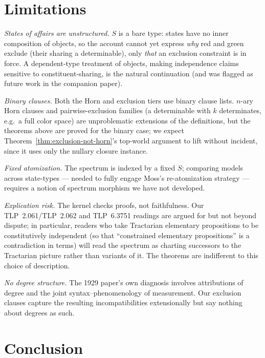\documentclass[10pt, letterpaper]{article}
\theoremstyle{remark}
\newcommand{\TLP}[1]{TLP~#1}
\begin{document}
\section{Limitations}\label{sec:limitations}

\emph{States of affairs are unstructured.} $S$ is a bare type: states have
no inner composition of objects, so the account cannot yet express
\emph{why} red and green exclude (their sharing a determinable), only
\emph{that} an exclusion constraint is in force. A dependent-type treatment
of objects, making independence claims sensitive to constituent-sharing, is
the natural continuation (and was flagged as future work in the companion
paper).

\emph{Binary clauses.} Both the Horn and exclusion tiers use binary clause
lists. $n$-ary Horn clauses and pairwise-exclusion families (a determinable
with $k$ determinates, e.g.\ a full color space) are unproblematic
extensions of the definitions, but the theorems above are proved for the
binary case; we expect Theorem~\ref{thm:exclusion-not-horn}'s top-world
argument to lift without incident, since it uses only the nullary closure
instance.

\emph{Fixed atomization.} The spectrum is indexed by a fixed $S$; comparing
models across state-types --- needed to fully engage Moss's re-atomization
strategy --- requires a notion of spectrum morphism we have not developed.

\emph{Explication risk.} The kernel checks proofs, not faithfulness. Our
\TLP{2.061}/\TLP{2.062} and \TLP{6.3751} readings are argued for but not
beyond dispute; in particular, readers who take Tractarian elementary
propositions to be constitutively independent (so that ``constrained
elementary propositions'' is a contradiction in terms) will read the spectrum
as charting successors to the Tractarian picture rather than variants of it.
The theorems are indifferent to this choice of description.

\emph{No degree structure.} The 1929 paper's own diagnosis involves
attributions of degree and the joint syntax--phenomenology of measurement.
Our exclusion clauses capture the resulting incompatibilities extensionally
but say nothing about degrees as such.

\section{Conclusion}\label{sec:conclusion}
\end{document}
